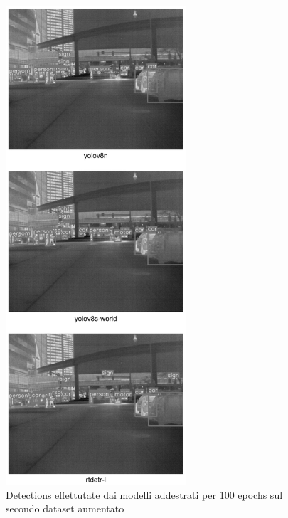 \begin{figure}[ht]
    \centering
    \includegraphics[width=0.6\textwidth]{files/capitoli/4-sperimentazione-risultati/assets/augmented-data-2(100)-detections.png}
    \caption{\label{fig:augmented-data-2(100)-detections}Detections effettutate dai modelli addestrati per 100 epochs sul secondo dataset aumentato}
\end{figure}

\clearpage